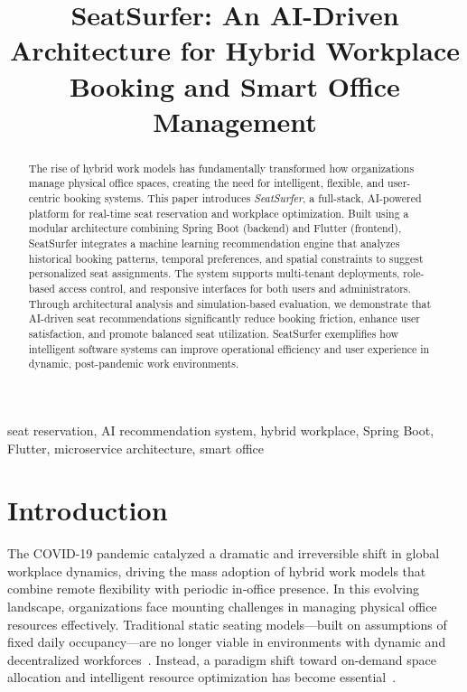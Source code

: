 \documentclass[onecolumn, 12pt]{IEEEtran}
\title{SeatSurfer: An AI-Driven Architecture for Hybrid Workplace Booking and Smart Office Management}
\author{
    \IEEEauthorblockN{Radu-Matei Prodan }
    \IEEEauthorblockA{
        \textit{Faculty of Mathematics and Computer Science} \\
        \textit{Babeș-Bolyai University}\\
        Cluj-Napoca, Romania \\
        radu.prodan@stud.ubbcluj.ro
    }
}
\begin{document}
\maketitle

\begin{abstract}
The rise of hybrid work models has fundamentally transformed how organizations manage physical office spaces, creating the need for intelligent, flexible, and user-centric booking systems. This paper introduces \textit{SeatSurfer}, a full-stack, AI-powered platform for real-time seat reservation and workplace optimization. Built using a modular architecture combining Spring Boot (backend) and Flutter (frontend), SeatSurfer integrates a machine learning recommendation engine that analyzes historical booking patterns, temporal preferences, and spatial constraints to suggest personalized seat assignments. The system supports multi-tenant deployments, role-based access control, and responsive interfaces for both users and administrators. Through architectural analysis and simulation-based evaluation, we demonstrate that AI-driven seat recommendations significantly reduce booking friction, enhance user satisfaction, and promote balanced seat utilization. SeatSurfer exemplifies how intelligent software systems can improve operational efficiency and user experience in dynamic, post-pandemic work environments.
\end{abstract}

\begin{IEEEkeywords}
seat reservation, AI recommendation system, hybrid workplace, Spring Boot, Flutter, microservice architecture, smart office
\end{IEEEkeywords}

\section{Introduction}

The COVID-19 pandemic catalyzed a dramatic and irreversible shift in global workplace dynamics, driving the mass adoption of hybrid work models that combine remote flexibility with periodic in-office presence. In this evolving landscape, organizations face mounting challenges in managing physical office resources effectively. Traditional static seating models—built on assumptions of fixed daily occupancy—are no longer viable in environments with dynamic and decentralized workforces~\cite{baker2021hybrid,nayyar2021smart}. Instead, a paradigm shift toward on-demand space allocation and intelligent resource optimization has become essential~\cite{manogaran2023hybrid}.
\end{document}
